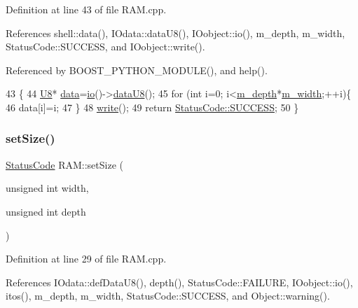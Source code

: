 Definition at line 43 of file R\+A\+M.\+cpp.



References shell\+::data(), I\+Odata\+::data\+U8(), I\+Oobject\+::io(), m\+\_\+depth, m\+\_\+width, Status\+Code\+::\+S\+U\+C\+C\+E\+SS, and I\+Oobject\+::write().



Referenced by B\+O\+O\+S\+T\+\_\+\+P\+Y\+T\+H\+O\+N\+\_\+\+M\+O\+D\+U\+L\+E(), and help().


\begin{DoxyCode}
43                    \{
44   \hyperlink{ICECALv3_8h_a3cb25ca6f51f003950f9625ff05536fc}{U8}* \hyperlink{namespaceshell_a5ea2525995cedc3efd69ea8a7f034d1e}{data}=\hyperlink{classIOobject_af04fb94137c3d86849f478ac5afab5d1}{io}()->\hyperlink{classIOdata_a75e9c318dbac3a39402179070943d4bc}{dataU8}();
45   \textcolor{keywordflow}{for} (\textcolor{keywordtype}{int} i=0; i<\hyperlink{classRAM_a7f23b0ac79ae5d954c968814c628ac53}{m\_depth}*\hyperlink{classRAM_a9921651055311f968a843e2931f45164}{m\_width};++i)\{
46     data[i]=i;
47   \} 
48   \hyperlink{classIOobject_a9f6984bc9f0fadcf800f1be2523ac744}{write}();
49   \textcolor{keywordflow}{return} \hyperlink{classStatusCode_a6f565cbeadc76d14c72f047e5e85eb4badd0da38d3ba0d922efd1f4619bc37ad8}{StatusCode::SUCCESS};
50 \}
\end{DoxyCode}
\mbox{\label{classRAM_adcf2ebb12f1a3e833ce7d5a33670c29d}} 
\subsubsection{\texorpdfstring{set\+Size()}{setSize()}}
{\footnotesize\ttfamily \hyperlink{classStatusCode}{Status\+Code} R\+A\+M\+::set\+Size (\begin{DoxyParamCaption}\item[{unsigned int}]{width,  }\item[{unsigned int}]{depth }\end{DoxyParamCaption})}



Definition at line 29 of file R\+A\+M.\+cpp.



References I\+Odata\+::def\+Data\+U8(), depth(), Status\+Code\+::\+F\+A\+I\+L\+U\+RE, I\+Oobject\+::io(), itos(), m\+\_\+depth, m\+\_\+width, Status\+Code\+::\+S\+U\+C\+C\+E\+SS, and Object\+::warning().



